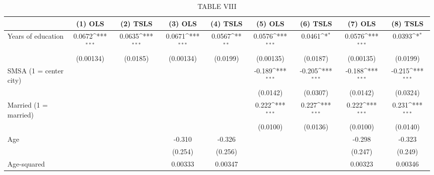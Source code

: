 \begin{table}[htbp]\centering
\def\sym#1{\ifmmode^{#1}\else\(^{#1}\)\fi}
\caption{TABLE VIII}
\begin{tabular}{l*{8}{c}}
\hline\hline
                         &\multicolumn{1}{c}{(1) OLS}&\multicolumn{1}{c}{(2) TSLS}&\multicolumn{1}{c}{(3) OLS}&\multicolumn{1}{c}{(4) TSLS}&\multicolumn{1}{c}{(5) OLS}&\multicolumn{1}{c}{(6) TSLS}&\multicolumn{1}{c}{(7) OLS}&\multicolumn{1}{c}{(8) TSLS}\\
\hline
Years of education       &      0.0672\sym{***}&      0.0635\sym{***}&      0.0671\sym{***}&      0.0567\sym{**} &      0.0576\sym{***}&      0.0461\sym{*}  &      0.0576\sym{***}&      0.0393\sym{*}  \\
                         &   (0.00134)         &    (0.0185)         &   (0.00134)         &    (0.0199)         &   (0.00135)         &    (0.0187)         &   (0.00135)         &    (0.0199)         \\
[1em]
SMSA (1 = center city)   &                     &                     &                     &                     &      -0.189\sym{***}&      -0.205\sym{***}&      -0.188\sym{***}&      -0.215\sym{***}\\
                         &                     &                     &                     &                     &    (0.0142)         &    (0.0307)         &    (0.0142)         &    (0.0324)         \\
[1em]
Married (1 = married)    &                     &                     &                     &                     &       0.222\sym{***}&       0.227\sym{***}&       0.222\sym{***}&       0.231\sym{***}\\
                         &                     &                     &                     &                     &    (0.0100)         &    (0.0136)         &    (0.0100)         &    (0.0140)         \\
[1em]
Age                      &                     &                     &      -0.310         &      -0.326         &                     &                     &      -0.298         &      -0.323         \\
                         &                     &                     &     (0.254)         &     (0.256)         &                     &                     &     (0.247)         &     (0.249)         \\
[1em]
Age-squared              &                     &                     &     0.00333         &     0.00347         &                     &                     &     0.00323         &     0.00346         \\

\end{tabular}
\end{table}
